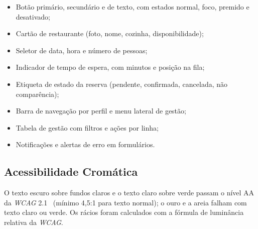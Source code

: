 \begin{itemize}
    \item Botão primário, secundário e de texto, com estados normal, foco, premido e desativado;
    \item Cartão de restaurante (foto, nome, cozinha, disponibilidade);
    \item Seletor de data, hora e número de pessoas;
    \item Indicador de tempo de espera, com minutos e posição na fila;
    \item Etiqueta de estado da reserva (pendente, confirmada, cancelada, não comparência);
    \item Barra de navegação por perfil e menu lateral de gestão;
    \item Tabela de gestão com filtros e ações por linha;
    \item Notificações e alertas de erro em formulários.
\end{itemize}

\subsection{Acessibilidade Cromática}

O texto escuro sobre fundos claros e o texto claro sobre verde passam o nível AA da \textit{WCAG} 2.1~\cite{wcag} (mínimo 4,5:1 para texto normal); o ouro e a areia falham com texto claro ou verde. Os rácios foram calculados com a fórmula de luminância relativa da \textit{WCAG}.

